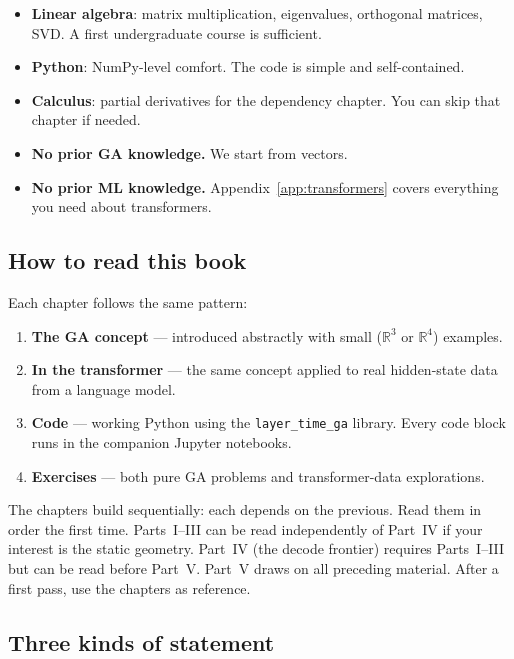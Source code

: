 \documentclass[11pt, twoside, openright]{memoir}
\numberwithin{equation}{chapter}
\begin{document}
\begin{itemize}[nosep]
\item \textbf{Linear algebra}: matrix multiplication, eigenvalues,
  orthogonal matrices, SVD.  A first undergraduate course is sufficient.
\item \textbf{Python}: NumPy-level comfort.  The code is simple and
  self-contained.
\item \textbf{Calculus}: partial derivatives for the dependency chapter.
  You can skip that chapter if needed.
\item \textbf{No prior GA knowledge.}  We start from vectors.
\item \textbf{No prior ML knowledge.}  Appendix~\ref{app:transformers}
  covers everything you need about transformers.
\end{itemize}

\subsection*{How to read this book}

Each chapter follows the same pattern:

\begin{enumerate}[nosep]
\item \textbf{The GA concept} --- introduced abstractly with small
  ($\mathbb{R}^3$ or $\mathbb{R}^4$) examples.
\item \textbf{In the transformer} --- the same concept applied to real
  hidden-state data from a language model.
\item \textbf{Code} --- working Python using the \texttt{layer\_time\_ga}
  library.  Every code block runs in the companion Jupyter notebooks.
\item \textbf{Exercises} --- both pure GA problems and transformer-data
  explorations.
\end{enumerate}

The chapters build sequentially: each depends on the previous.  Read
them in order the first time.  Parts~I--III can be read independently
of Part~IV if your interest is the static geometry.  Part~IV (the
decode frontier) requires Parts~I--III but can be read before Part~V.
Part~V draws on all preceding material.  After a first pass, use the
chapters as reference.

\subsection*{Three kinds of statement}
\end{document}
